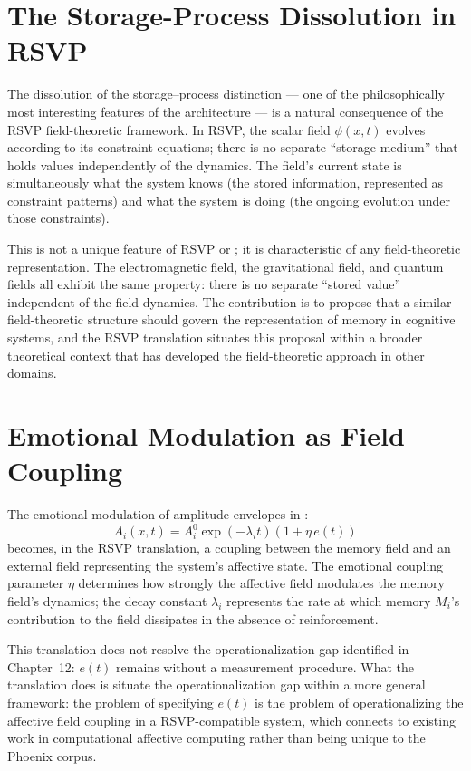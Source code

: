 \section{The Storage-Process Dissolution in RSVP}
\label{sec:storage-process-rsvp}

The dissolution of the storage--process distinction
--- one of the philosophically most interesting features
of the \MEMeight{} architecture --- is a natural
consequence of the RSVP field-theoretic framework.
In RSVP, the scalar field $\phi(x,t)$ evolves according
to its constraint equations; there is no separate
``storage medium'' that holds values independently
of the dynamics. The field's current state is
simultaneously what the system knows (the stored
information, represented as constraint patterns) and
what the system is doing (the ongoing evolution under
those constraints).

This is not a unique feature of RSVP or \MEMeight{};
it is characteristic of any field-theoretic representation.
The electromagnetic field, the gravitational field,
and quantum fields all exhibit the same property:
there is no separate ``stored value'' independent of
the field dynamics. The \MEMeight{} contribution is
to propose that a similar field-theoretic structure
should govern the representation of memory in cognitive
systems, and the RSVP translation situates this
proposal within a broader theoretical context that
has developed the field-theoretic approach in other
domains.

\section{Emotional Modulation as Field Coupling}
\label{sec:emotional-modulation}

The emotional modulation of amplitude envelopes in
\MEMeight{}:
\[
  A_i(x,t) = A_i^0\exp(-\lambda_i t)(1 + \eta\,e(t))
\]
becomes, in the RSVP translation, a coupling between
the memory field and an external field representing
the system's affective state. The emotional coupling
parameter $\eta$ determines how strongly the affective
field modulates the memory field's dynamics; the
decay constant $\lambda_i$ represents the rate at
which memory $M_i$'s contribution to the field
dissipates in the absence of reinforcement.

This translation does not resolve the operationalization
gap identified in Chapter~12: $e(t)$ remains without
a measurement procedure. What the translation does
is situate the operationalization gap within a more
general framework: the problem of specifying $e(t)$
is the problem of operationalizing the affective field
coupling in a RSVP-compatible system, which connects
to existing work in computational affective computing
rather than being unique to the Phoenix corpus.

